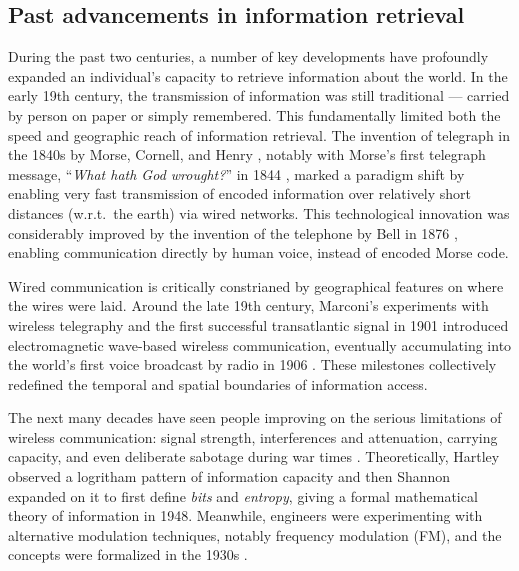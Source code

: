 \documentclass[final-report]{report-template}
\begin{document}
\subsection{Past advancements in information retrieval}
During the past two centuries, a number of key developments have profoundly
expanded an individual's capacity to retrieve information about the world. In
the early 19th century, the transmission of information was still traditional
--- carried by person on paper or simply remembered. This fundamentally limited
both the speed and geographic reach of information retrieval. The invention of
telegraph in the 1840s by Morse, Cornell, and Henry \cite{history.telegraph.1,
history.telegraph.2}, notably with Morse's first telegraph message,
``\emph{What hath God wrought?}'' in 1844 \cite{first.telegraph.msg}, marked a
paradigm shift by enabling very fast transmission of encoded information over
relatively short distances (w.r.t.\ the earth) via wired networks.  This
technological innovation was considerably improved by the invention of the
telephone by Bell in 1876 \cite{history.telephone.1, history.telephone.2},
enabling communication directly by human voice, instead of encoded Morse code.

Wired communication is critically constrianed by geographical
features on where the wires were laid. Around the late 19th century, 
Marconi's experiments with wireless telegraphy \cite{history.wireless.1} and
the first successful transatlantic signal in 1901
\cite{history.first.atlantic.broadcast} introduced electromagnetic wave-based
wireless communication, eventually accumulating into the world's first voice
broadcast by radio in 1906 \cite{first.voice.broadcast}. These milestones
collectively redefined the temporal and spatial boundaries of information
access.

The next many decades have seen people improving on the serious limitations of
wireless communication: signal strength, interferences and attenuation,
carrying capacity, and even deliberate sabotage during war times
\cite{wireless.weakness.1, wireless.weakness.2, wireless.weakness.3}.
Theoretically, Hartley observed a logritham pattern of information capacity
\cite{hartley.log.information} and then Shannon expanded on it to first define
\emph{bits} and \emph{entropy}, giving a formal mathematical theory of
information \cite{shannon.theory.communication} in 1948. Meanwhile,
engineers were experimenting with alternative modulation techniques, notably
frequency modulation (FM), and the concepts were formalized in the 1930s
\cite{history.modulation}. 
\end{document}
